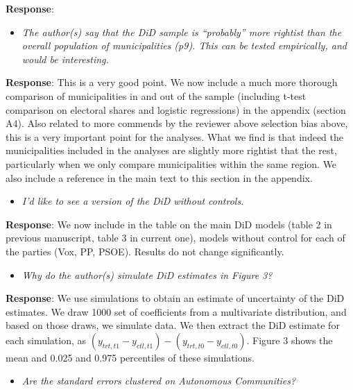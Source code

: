 \documentclass[12pt, a4paper, notitlepage]{article}
\begin{document}
\textbf{Response}: {\color{red}{pending}}

\begin{itemize}
  \item \textit{The author(s) say that the DiD sample is “probably” more rightist than the overall
  population of municipalities (p9). This can be tested empirically, and would be
  interesting.}
\end{itemize}

\textbf{Response}: This is a very good point. We now include a much more thorough comparison of municipalities in and out of the sample (including t-test comparison on electoral shares and logistic regressions) in the appendix (section A4). Also related to more commends by the reviewer above selection bias above, this is a very important point for the analyses. What we find is that indeed the municipalities included in the analyses are slightly more rightist that the rest, particularly when we only compare municipalities within the same region.
We also include a reference in the main text to this section in the appendix.

\begin{itemize}
  \item \textit{I’d like to see a version of the DiD without controls.}
\end{itemize}

\textbf{Response}: We now include in the table on the main DiD models (table 2 in previous manuscript, table 3 in current one), models without control for each of the parties (Vox, PP, PSOE). Results do not change significantly.

\begin{itemize}
  \item \textit{Why do the author(s) simulate DiD estimates in Figure 3?}
\end{itemize}

\textbf{Response}: We use simulations to obtain an estimate of uncertainty of the DiD estimates. We draw 1000 set of coefficients from a multivariate distribution, and based on those draws, we simulate data. We then extract the DiD estimate for each simulation, as $(y_{trt, t1} - y_{ctl, t1})-(y_{trt, t0} - y_{ctl, t0})$.
Figure 3 shows the mean and 0.025 and 0.975 percentiles of these simulations.

\begin{itemize}
  \item \textit{Are the standard errors clustered on Autonomous Communities?}
\end{itemize}
\end{document}
